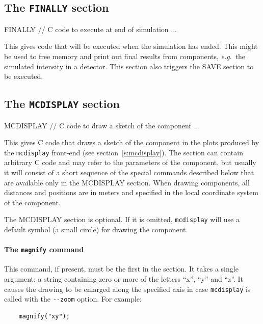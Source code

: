 \subsection{The \texttt{FINALLY} section}
\label{s:comp-finally}

\begin{mcstas}
FINALLY
// C code to execute at end of simulation ...
\end{mcstas}

This gives code that will be executed when the simulation has ended. This might
be used to free memory and print out final results from components,
\textit{e.g}.\ the simulated intensity in a detector. This section also triggers
the SAVE section to be executed.

\subsection{The \texttt{MCDISPLAY} section}
\label{s:comp-mcdisplay}

\begin{mcstas}
MCDISPLAY
// C code to draw a sketch of the component ...
\end{mcstas}

This gives C code that draws a sketch of the component in the plots
produced by the \verb+mcdisplay+ front-end (see
section~\ref{s:mcdisplay}). The section can contain arbitrary C code and
may refer to the parameters of the component, but usually it will
consist of a short sequence of the special commands described below that
are available only in the MCDISPLAY section.
When drawing components, all distances and positions are in meters and
specified in the local coordinate system of the component.

The MCDISPLAY section is optional. If it is omitted, \verb+mcdisplay+
will use a default symbol (a small circle) for drawing the component.

\paragraph{The \texttt{magnify} command}

This command, if present, must be the first in the section. It takes a
single argument: a string containing zero or more of the letters ``x'',
``y'' and ``z''. It causes the drawing to be enlarged along the
specified axis in case \verb+mcdisplay+ is called with the \verb+--zoom+
option. For example:
\begin{lstlisting}
    magnify("xy");
\end{lstlisting}


